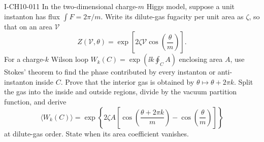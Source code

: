 \begin{exercise}{I-CH10-011}
In the two-dimensional charge-$m$ Higgs model, suppose a unit instanton has
flux $\int F=2\pi/m$.  Write its dilute-gas fugacity per unit area as $\zeta$,
so that on an area $\mathcal V$
\[
  Z(\mathcal V,\theta)=
  \exp\left[2\zeta\mathcal V\cos\left(\frac\theta m\right)\right].
\]
For a charge-$k$ Wilson loop $W_k(C)=\exp(\ii k\oint_C A)$ enclosing area
$A$, use Stokes' theorem to find the phase contributed by every instanton or
anti-instanton inside $C$.  Prove that the interior gas is obtained by
$\theta\mapsto\theta+2\pi k$.  Split the gas into the inside and outside
regions, divide by the vacuum partition function, and derive
\[
  \langle W_k(C)\rangle=
  \exp\left\{2\zeta A\left[
  \cos\left(\frac{\theta+2\pi k}{m}\right)
  -\cos\left(\frac\theta m\right)\right]\right\}
\]
at dilute-gas order.  State when its area coefficient vanishes.
\end{exercise}
